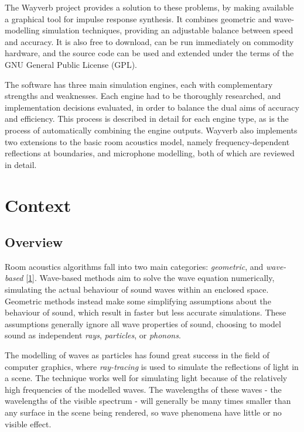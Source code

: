 \documentclass[]{scrreprt}
\begin{document}
The Wayverb project provides a solution to these problems, by making
available a graphical tool for impulse response synthesis. It combines
geometric and wave-modelling simulation techniques, providing an
adjustable balance between speed and accuracy. It is also free to
download, can be run immediately on commodity hardware, and the source
code can be used and extended under the terms of the GNU General Public
License (GPL).

The software has three main simulation engines, each with complementary
strengths and weaknesses. Each engine had to be thoroughly researched,
and implementation decisions evaluated, in order to balance the dual
aims of accuracy and efficiency. This process is described in detail for
each engine type, as is the process of automatically combining the
engine outputs. Wayverb also implements two extensions to the basic room
acoustics model, namely frequency-dependent reflections at boundaries,
and microphone modelling, both of which are reviewed in detail.

\chapter{Context}\label{context}

\section{Overview}\label{overview}

Room acoustics algorithms fall into two main categories:
\emph{geometric}, and \emph{wave-based}
{[}\protect\hyperlink{ref-southernux5fspatialux5f2011}{1}{]}. Wave-based
methods aim to solve the wave equation numerically, simulating the
actual behaviour of sound waves within an enclosed space. Geometric
methods instead make some simplifying assumptions about the behaviour of
sound, which result in faster but less accurate simulations. These
assumptions generally ignore all wave properties of sound, choosing to
model sound as independent \emph{rays}, \emph{particles}, or
\emph{phonons}.

The modelling of waves as particles has found great success in the field
of computer graphics, where \emph{ray-tracing} is used to simulate the
reflections of light in a scene. The technique works well for simulating
light because of the relatively high frequencies of the modelled waves.
The wavelengths of these waves - the wavelengths of the visible spectrum
- will generally be many times smaller than any surface in the scene
being rendered, so wave phenomena have little or no visible effect.
\end{document}
